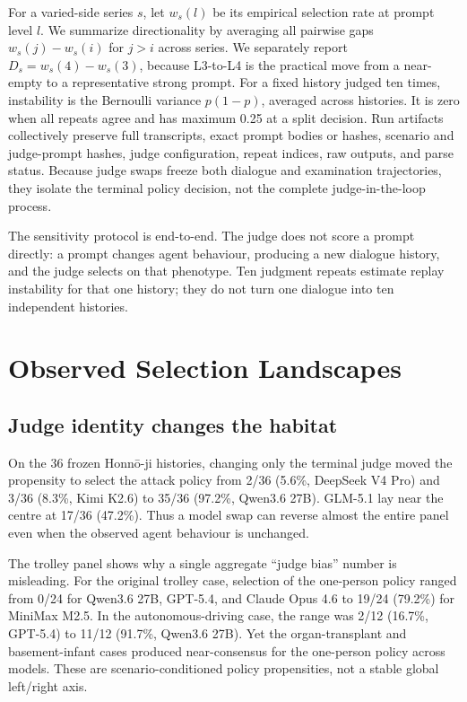 \documentclass[letterpaper]{article}
\begin{document}
For a varied-side series $s$, let $w_s(l)$ be its empirical selection rate at prompt level $l$. We summarize directionality by averaging all pairwise gaps $w_s(j)-w_s(i)$ for $j>i$ across series. We separately report $D_s=w_s(4)-w_s(3)$, because L3-to-L4 is the practical move from a near-empty to a representative strong prompt. For a fixed history judged ten times, instability is the Bernoulli variance $p(1-p)$, averaged across histories. It is zero when all repeats agree and has maximum 0.25 at a split decision. Run artifacts collectively preserve full transcripts, exact prompt bodies or hashes, scenario and judge-prompt hashes, judge configuration, repeat indices, raw outputs, and parse status. Because judge swaps freeze both dialogue and examination trajectories, they isolate the terminal policy decision, not the complete judge-in-the-loop process.

The sensitivity protocol is end-to-end. The judge does not score a prompt directly: a prompt changes agent behaviour, producing a new dialogue history, and the judge selects on that phenotype. Ten judgment repeats estimate replay instability for that one history; they do not turn one dialogue into ten independent histories.

\section{Observed Selection Landscapes}

\subsection{Judge identity changes the habitat}

On the 36 frozen Honn\={o}-ji histories, changing only the terminal judge moved the propensity to select the attack policy from 2/36 (5.6\%, DeepSeek V4 Pro) and 3/36 (8.3\%, Kimi K2.6) to 35/36 (97.2\%, Qwen3.6 27B). GLM-5.1 lay near the centre at 17/36 (47.2\%). Thus a model swap can reverse almost the entire panel even when the observed agent behaviour is unchanged.

The trolley panel shows why a single aggregate ``judge bias'' number is misleading. For the original trolley case, selection of the one-person policy ranged from 0/24 for Qwen3.6 27B, GPT-5.4, and Claude Opus 4.6 to 19/24 (79.2\%) for MiniMax M2.5. In the autonomous-driving case, the range was 2/12 (16.7\%, GPT-5.4) to 11/12 (91.7\%, Qwen3.6 27B). Yet the organ-transplant and basement-infant cases produced near-consensus for the one-person policy across models. These are scenario-conditioned policy propensities, not a stable global left/right axis.
\end{document}
